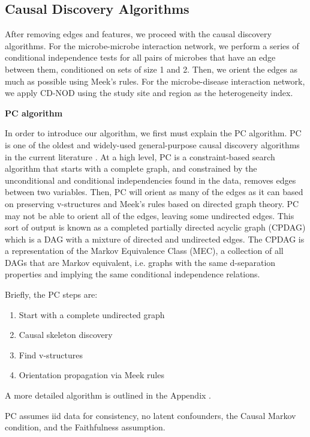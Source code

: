 \documentclass[12pt,letterpaper]{article}
\begin{document}
\subsection{Causal Discovery Algorithms}

After removing edges and features, we proceed with the causal discovery algorithms. For the microbe-microbe interaction network, we perform a series of conditional independence tests for all pairs of microbes that have an edge between them, conditioned on sets of size 1 and 2. Then, we orient the edges as much as possible using Meek’s rules. For the microbe-disease interaction network, we apply CD-NOD using the study site and region as the heterogeneity index. \newline

\textbf{PC algorithm}

In order to introduce our algorithm, we first must explain the PC algorithm. PC is one of the oldest and widely-used general-purpose causal discovery algorithms in the current literature \citep{glymour2019review}. At a high level, PC is a constraint-based search algorithm that starts with a complete graph, and constrained by the unconditional and conditional independencies found in the data, removes edges between two variables. Then, PC will orient as many of the edges as it can based on preserving v-structures and Meek’s rules based on directed graph theory. PC may not be able to orient all of the edges, leaving some undirected edges. This sort of output is known as a completed partially directed acyclic graph (CPDAG) which is a DAG with a mixture of directed and undirected edges. The CPDAG is a representation of the Markov Equivalence Class (MEC), a collection of all DAGs that are Markov equivalent, i.e. graphs with the same d-separation properties and implying the same conditional independence relations. 

Briefly, the PC steps are: 
\begin{enumerate}
    \item Start with a complete undirected graph
    \item Causal skeleton discovery
    \item Find v-structures
    \item Orientation propagation via Meek rules
\end{enumerate}

A more detailed algorithm is outlined in the Appendix \citep{spirtes2000causation}. 

PC assumes iid data for consistency, no latent confounders, the Causal Markov condition, and the Faithfulness assumption. 
\end{document}
